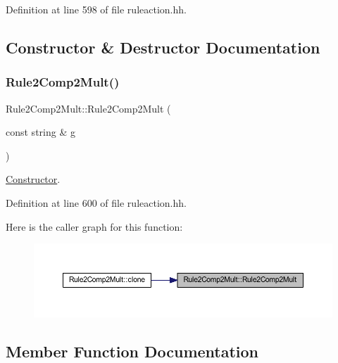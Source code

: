 Definition at line 598 of file ruleaction.\+hh.



\subsection{Constructor \& Destructor Documentation}
\mbox{\label{class_rule2_comp2_mult_a511ae7528464ac030c25acf15f24a93b}} 
\subsubsection{\texorpdfstring{Rule2Comp2Mult()}{Rule2Comp2Mult()}}
{\footnotesize\ttfamily Rule2\+Comp2\+Mult\+::\+Rule2\+Comp2\+Mult (\begin{DoxyParamCaption}\item[{const string \&}]{g }\end{DoxyParamCaption})\hspace{0.3cm}{\ttfamily [inline]}}



\mbox{\hyperlink{class_constructor}{Constructor}}. 



Definition at line 600 of file ruleaction.\+hh.

Here is the caller graph for this function\+:
\nopagebreak
\begin{figure}[H]
\begin{center}
\leavevmode
\includegraphics[width=350pt]{class_rule2_comp2_mult_a511ae7528464ac030c25acf15f24a93b_icgraph}
\end{center}
\end{figure}


\subsection{Member Function Documentation}
\mbox{\label{class_rule2_comp2_mult_a1a526d775f62b172a92886444b5889a3}} 

